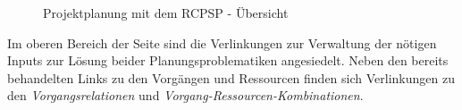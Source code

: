 \documentclass[a4paper,12pt,parskip,bibtotoc,liststotoc]{article}
\begin{document}
\begin{figure}[h!]
  \begin{center}
    \caption{Projektplanung mit dem RCPSP - Übersicht}  \label{RCPSP}
  \end{center}
\end{figure}

Im oberen Bereich der Seite sind die Verlinkungen zur Verwaltung der nötigen Inputs zur Lösung beider Planungsproblematiken angesiedelt. Neben den bereits behandelten Links zu den Vorgängen und Ressourcen finden sich Verlinkungen zu den \textit{Vorgangsrelationen} und \textit{Vorgang-Ressourcen-Kombinationen}.\\ 
\end{document}
